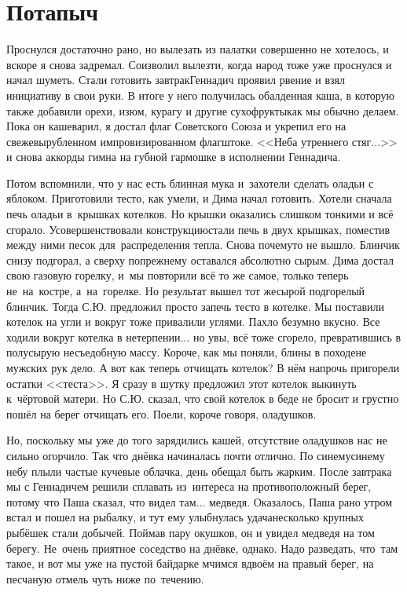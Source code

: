 \chapter{Потапыч} 
\vepsianrose

Проснулся достаточно рано, но вылезать из палатки совершенно не хотелось, и вскоре я снова задремал. Соизволил вылезти, когда народ тоже уже проснулся и начал шуметь. Стали готовить завтрак\mdash Геннадич проявил рвение и взял инициативу в свои руки. В итоге у него получилась обалденная каша, в которую также добавили орехи, изюм, курагу и другие сухофрукты\mdash как мы обычно делаем. Пока он кашеварил, я достал флаг Советского Союза и укрепил его на свежевырубленном импровизированном флагштоке. <<Неба утреннего стяг$\ldots$>> и снова аккорды гимна на губной гармошке в исполнении Геннадича. 

Потом вспомнили, что у нас есть блинная мука и~захотели сделать оладьи с яблоком. Приготовили тесто, как умели, и Дима начал готовить. Хотели сначала печь оладьи в~крышках котелков. Но крышки оказались слишком тонкими и всё сгорало. Усовершенствовали конструкцию\mdash стали печь в двух крышках, поместив между ними песок для~распределения тепла. Снова почему\sdash то не вышло. Блинчик снизу подгорал, а сверху по\sdash прежнему оставался абсолютно сырым. Дима достал свою газовую горелку, и~мы повторили всё то же самое, только теперь не~на~костре, а~на~горелке. Но результат вышел тот же\mdash сырой подгорелый блинчик. Тогда С.Ю. предложил просто запечь тесто в котелке. Мы поставили котелок на угли и вокруг тоже привалили углями. Пахло безумно вкусно. Все ходили вокруг котелка в нетерпении$\ldots$ но увы, всё тоже сгорело, превратившись в полусырую несъедобную массу. Короче, как мы поняли, блины в походе\mdash не мужских рук дело. А вот как теперь отчищать котелок? В нём напрочь пригорели остатки <<теста>>. Я сразу в шутку предложил этот котелок выкинуть к~чёртовой матери. Но С.Ю. сказал, что свой котелок в беде не бросит и грустно пошёл на берег отчищать его. Поели, короче говоря, оладушков.

Но, поскольку мы уже до того зарядились кашей, отсутствие оладушков нас не сильно огорчило. Так что днёвка начиналась почти отлично. По синему\sdash синему небу плыли частые кучевые облачка, день обещал быть жарким. После завтрака мы с Геннадичем решили сплавать из~интереса на противоположный берег, потому что Паша сказал, что видел там$\ldots$ медведя. Оказалось, Паша рано утром встал и пошел на рыбалку, и тут ему улыбнулась удача\mdash несколько крупных рыбёшек стали добычей. Поймав пару окушков, он и увидел медведя на том берегу. Не~очень приятное соседство на днёвке, однако. Надо разведать, что~там такое, и вот мы уже на пустой байдарке мчимся вдвоём на правый берег, на песчаную отмель чуть ниже по~течению. 

